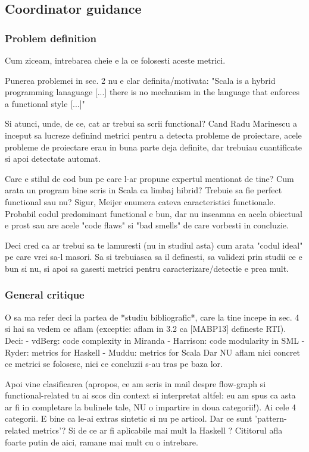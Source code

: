 \documentclass{article}
\begin{document}
\subsection {Coordinator guidance}

\subsubsection {Problem definition}
Cum ziceam, intrebarea cheie e la ce folosesti aceste metrici.

Punerea problemei in sec. 2 nu e clar definita/motivata:
"Scala is a hybrid programming lanaguage [...] there is no mechanism in
the language that enforces a functional style [...]"

Si atunci, unde, de ce, cat ar trebui sa scrii functional?
Cand Radu Marinescu a inceput sa lucreze definind metrici pentru a detecta
probleme de proiectare, acele probleme de proiectare erau in buna parte
deja definite, dar trebuiau cuantificate si apoi detectate automat.

Care e stilul de cod bun pe care l-ar propune expertul mentionat de tine?
Cum arata un program bine scris in Scala ca limbaj hibrid?
Trebuie sa fie perfect functional sau nu?
Sigur, Meijer enumera cateva caracteristici functionale. Probabil codul
predominant functional e bun, dar nu inseamna ca acela obiectual e prost
sau are acele "code flaws" si "bad smells" de care vorbesti in concluzie.

Deci cred ca ar trebui sa te lamuresti (nu in studiul asta) cum arata
"codul ideal" pe care vrei sa-l masori. Sa si trebuiasca sa il definesti,
sa validezi prin studii ce e bun si nu, si apoi sa gasesti metrici
pentru caracterizare/detectie e prea mult.

\subsubsection {General critique}


O sa ma refer deci la partea de *studiu bibliografic*, care la tine
incepe in sec. 4 si hai sa vedem ce aflam (exceptie: aflam in 3.2 ca
[MABP13] defineste RTI). Deci:
- vdBerg: code complexity in Miranda
- Harrison: code modularity in SML
- Ryder: metrics for Haskell
- Muddu: metrics for Scala
Dar NU aflam nici concret ce metrici se folosesc, nici ce concluzii
s-au tras pe baza lor.

Apoi vine clasificarea (apropos, ce am scris in mail despre flow-graph
si functional-related tu ai scos din context si interpretat altfel:
eu am spus ca asta ar fi in completare la bulinele tale, NU o impartire
in doua categorii!).
Ai cele 4 categorii. E bine ca le-ai extras sintetic si nu pe articol.
Dar ce sunt 'pattern-related metrics'? Si de ce ar fi aplicabile
mai mult la Haskell ? Cititorul afla foarte putin de aici, ramane mai
mult cu o intrebare.
\end{document}
